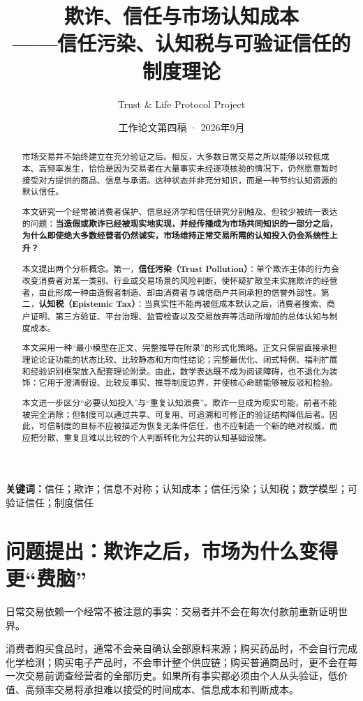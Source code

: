 \documentclass[UTF8,12pt]{ctexart}
\title{\textbf{欺诈、信任与市场认知成本}\\[0.6em]
\large ——信任污染、认知税与可验证信任的制度理论}
\author{Trust \& Life Protocol Project}
\date{工作论文第四稿 · 2026年9月}
\begin{document}
\maketitle

\begin{abstract}
市场交易并不始终建立在充分验证之后。相反，大多数日常交易之所以能够以较低成本、高频率发生，恰恰是因为交易者在大量事实未经逐项核验的情况下，仍然愿意暂时接受对方提供的商品、信息与承诺。这种状态并非充分知识，而是一种节约认知资源的默认信任。

本文研究一个经常被消费者保护、信息经济学和信任研究分别触及、但较少被统一表达的问题：\textbf{当造假或欺诈已经被现实地实现，并经传播成为市场共同知识的一部分之后，为什么即使绝大多数经营者仍然诚实，市场维持正常交易所需的认知投入仍会系统性上升？}

本文提出两个分析概念。第一，\textbf{信任污染（Trust Pollution）}：单个欺诈主体的行为会改变消费者对某一类别、行业或交易场景的风险判断，使怀疑扩散至未实施欺诈的经营者，由此形成一种由造假者制造、却由消费者与诚信商户共同承担的信誉外部性。第二，\textbf{认知税（Epistemic Tax）}：当真实性不能再被低成本默认之后，消费者搜索、商户证明、第三方验证、平台治理、监管检查以及交易放弃等活动所增加的总体认知与制度成本。

本文采用一种“最小模型在正文、完整推导在附录”的形式化策略。正文只保留直接承担理论论证功能的状态比较、比较静态和方向性结论；完整最优化、闭式特例、福利扩展和经验识别框架放入配套理论附录。由此，数学表达既不成为阅读障碍，也不退化为装饰：它用于澄清假设、比较反事实、推导制度边界，并使核心命题能够被反驳和检验。

本文进一步区分“必要认知投入”与“重复认知浪费”。欺诈一旦成为现实可能，前者不能被完全消除；但制度可以通过共享、可复用、可追溯和可修正的验证结构降低后者。因此，可信制度的目标不应被描述为恢复无条件信任，也不应制造一个新的绝对权威，而应把分散、重复且难以比较的个人判断转化为公共的认知基础设施。
\end{abstract}

\noindent\textbf{关键词：}信任；欺诈；信息不对称；认知成本；信任污染；认知税；数学模型；可验证信任；制度信任

\section{问题提出：欺诈之后，市场为什么变得更“费脑”}

日常交易依赖一个经常不被注意的事实：交易者并不会在每次付款前重新证明世界。

消费者购买食品时，通常不会亲自确认全部原料来源；购买药品时，不会自行完成化学检测；购买电子产品时，不会审计整个供应链；购买普通商品时，更不会在每一次交易前调查经营者的全部历史。如果所有事实都必须由个人从头验证，低价值、高频率交易将承担难以接受的时间成本、信息成本和判断成本。
\end{document}
